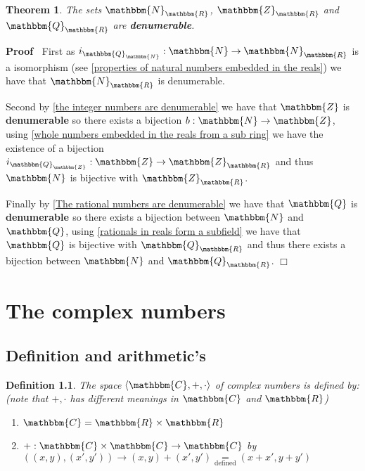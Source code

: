 \documentclass{book}
\newcommand{\equallim}{\mathop{=}\limits}
\newcommand{\tmop}[1]{\ensuremath{\operatorname{#1}}}
\newcommand{\tmtextbf}[1]{{\bfseries{#1}}}
\newcommand{\upl}{+}
\newenvironment{proof}{\noindent\textbf{Proof\ }}{\hspace*{\fill}$\Box$\medskip}
\newtheorem{definition}{Definition}
{\theorembodyfont{\rmfamily}\newtheorem{example}{Example}}
\newtheorem{theorem}{Theorem}
\begin{document}
{{\begin{theorem}
  The sets $\mathbbm{N}_{\mathbbm{R}}$, $\mathbbm{Z}_{\mathbbm{R}}$ and
  $\mathbbm{Q}_{\mathbbm{R}}$ are \tmtextbf{denumerable}.
\end{theorem}

\begin{proof}
  First as $i_{\mathbbm{Q}_{\mathbbm{N}}} : \mathbbm{N} \rightarrow
  \mathbbm{N}_{\mathbbm{R}}$ is a isomorphism (see \ref{properties of natural
  numbers embedded in the reals}) we have that $\mathbbm{N}_{\mathbbm{R}}$ is
  denumerable.
  
  Second by \ref{the integer numbers are denumerable} we have that
  $\mathbbm{Z}$ is \tmtextbf{denumerable} so there exists a bijection $b :
  \mathbbm{N} \rightarrow \mathbbm{Z}$, using \ref{whole numbers embedded in
  the reals from a sub ring} we have the existence of a bijection
  $i_{\mathbbm{Q}_{\mathbbm{Z}}} : \mathbbm{Z} \rightarrow
  \mathbbm{Z}_{\mathbbm{R}}$ and thus $\mathbbm{N}$ is bijective with
  $\mathbbm{Z}_{\mathbbm{R}}$.
  
  Finally by \ref{The rational numbers are denumerable} we have that
  $\mathbbm{Q}$ is \tmtextbf{denumerable }so there exists a bijection between
  $\mathbbm{N}$ and $\mathbbm{Q}$, using \ref{rationals in reals form a
  subfield} we have that $\mathbbm{Q}$ is bijective with
  $\mathbbm{Q}_{\mathbbm{R}}$ and thus there exists a bijection between
  $\mathbbm{N}$ and $\mathbbm{Q}_{\mathbbm{R}}$.
\end{proof}

\chapter{The complex numbers}

\section{Definition and arithmetic's}

\begin{definition}
  \label{complex numbers}{}The space $\langle
  \mathbbm{C}, +, \cdot \rangle$ of complex numbers is defined by: (note that
  $+, \cdot$ has different meanings in $\mathbbm{C}$ and $\mathbbm{R}$)
  \begin{enumerate}
    \item $\mathbbm{C}=\mathbbm{R} \times \mathbbm{R}$
    
    \item $\upl : \mathbbm{C} \times \mathbbm{C} \rightarrow \mathbbm{C}$ by
    $((x, y), (x', y')) \rightarrow (x, y) + (x', y')
    \equallim_{\tmop{defined}} (x + x', y + y')$
    

\end{enumerate}
\end{definition}}}
\end{document}
